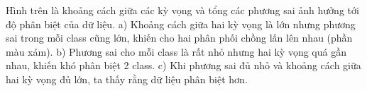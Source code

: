 \documentclass[a4paper, 12pt]{article}
\begin{document}
Hình trên là khoảng cách giữa các kỳ vọng và tổng các phương sai ảnh hưởng tới độ phân biệt của dữ liệu. a) Khoảng cách giữa hai kỳ vọng là lớn nhưng phương sai trong mỗi class cũng lớn, khiến cho hai phân phối chồng lấn lên nhau (phần màu xám). b) Phương sai cho mỗi class là rất nhỏ nhưng hai kỳ vọng quá gần nhau, khiến khó phân biệt 2 class. c) Khi phương sai đủ nhỏ và khoảng cách giữa hai kỳ vọng đủ lớn, ta thấy rằng dữ liệu phân biệt hơn.


\begin{figure}[ht]
   \hfill 	

\end{figure}
\end{document}
